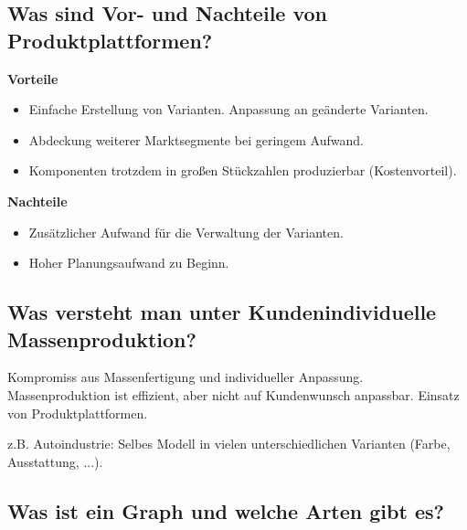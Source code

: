 \subsection{Was sind Vor- und Nachteile von Produktplattformen?}

\textbf{Vorteile}
\begin{itemize}
    \item Einfache Erstellung von Varianten. Anpassung an geänderte Varianten.
    \item Abdeckung weiterer Marktsegmente bei geringem Aufwand.
    \item Komponenten trotzdem in großen Stückzahlen produzierbar (Kostenvorteil).
\end{itemize}

\textbf{Nachteile}
\begin{itemize}
    \item Zusätzlicher Aufwand für die Verwaltung der Varianten.
    \item Hoher Planungsaufwand zu Beginn.
\end{itemize}

\subsection{Was versteht man unter Kundenindividuelle Massenproduktion?}

Kompromiss aus Massenfertigung und individueller Anpassung. Massenproduktion ist effizient, aber nicht auf Kundenwunsch anpassbar. Einsatz von Produktplattformen. 

z.B. Autoindustrie: Selbes Modell in vielen unterschiedlichen Varianten (Farbe, Ausstattung, ...).


\subsection{Was ist ein Graph und welche Arten gibt es?}


